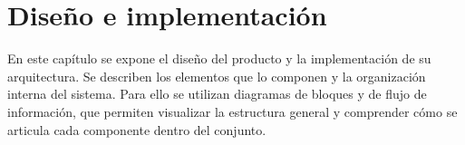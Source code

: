 \chapter{Diseño e implementación} %

\label{Chapter3} %

En este capítulo se expone el diseño del producto y la implementación de su arquitectura. Se describen los elementos que lo componen y la organización interna del sistema. Para ello se utilizan diagramas de bloques y de flujo de información, que permiten visualizar la estructura general y comprender cómo se articula cada componente dentro del conjunto.


